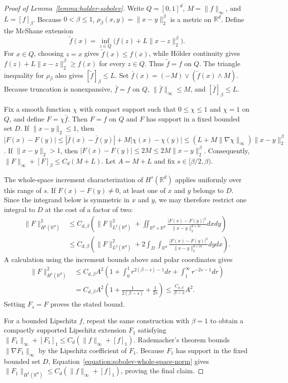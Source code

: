 \documentclass[letterpaper,12pt]{article}
\theoremstyle{definition}
\numberwithin{equation}{section}
\newcommand{\mr}{\mathbb{R}}
\newcommand{\norm}[1]{\lVert#1\rVert}
\begin{document}
\begin{proof}[Proof of Lemma~\ref{lemma:holder-sobolev}]
Write $Q=[0,1]^d$, $M=\norm{f}_\infty$, and $L=[f]_\beta$.
Because $0<\beta\leq1$, $\rho_\beta(x,y)=\norm{x-y}_2^\beta$ is a metric on $\mr^d$.
Define the McShane extension
\begin{equation}\label{equation:holder-extension}
\tilde f(x)=\inf_{z\in Q}\bigl(f(z)+L\norm{x-z}_2^\beta\bigr).
\end{equation}
For $x\in Q$, choosing $z=x$ gives $\tilde f(x)\leq f(x)$, while H\"older continuity gives $f(z)+L\norm{x-z}_2^\beta\geq f(x)$ for every $z\in Q$.
Thus $\tilde f=f$ on $Q$.
The triangle inequality for $\rho_\beta$ also gives $[\tilde f]_\beta\leq L$.
Set $\bar f(x)=(-M)\vee(\tilde f(x)\wedge M)$.
Because truncation is nonexpansive, $\bar f=f$ on $Q$, $\norm{\bar f}_\infty\leq M$, and $[\bar f]_\beta\leq L$.

Fix a smooth function $\chi$ with compact support such that $0\leq\chi\leq1$ and $\chi=1$ on $Q$, and define $F=\chi\bar f$.
Then $F=f$ on $Q$ and $F$ has support in a fixed bounded set $D$.
If $\norm{x-y}_2\leq1$, then $|F(x)-F(y)|\leq|\bar f(x)-\bar f(y)|+M|\chi(x)-\chi(y)|\leq(L+M\norm{\nabla\chi}_\infty)\norm{x-y}_2^\beta$.
If $\norm{x-y}_2>1$, then $|F(x)-F(y)|\leq2M\leq2M\norm{x-y}_2^\beta$.
Consequently, $\norm{F}_\infty+[F]_\beta\leq C_d(M+L)$.
Let $A=M+L$ and fix $s\in[\beta/2,\beta)$.

The whole-space increment characterization of $H^s(\mr^d)$ \citep{adams2003sobolev} applies uniformly over this range of $s$.
If $F(x)-F(y)\neq0$, at least one of $x$ and $y$ belongs to $D$.
Since the integrand below is symmetric in $x$ and $y$, we may therefore restrict one integral to $D$ at the cost of a factor of two:
\begin{align*}
\norm{F}_{H^s(\mr^d)}^2&\leq C_{d,\beta}\left(\norm{F}_{L^2(\mr^d)}^2+\iint_{\mr^d\times\mr^d}\frac{|F(x)-F(y)|^2}{\norm{x-y}_2^{d+2s}}dxdy\right)\\
&\leq C_{d,\beta}\left(\norm{F}_{L^2(\mr^d)}^2+2\int_D\int_{\mr^d}\frac{|F(x)-F(y)|^2}{\norm{x-y}_2^{d+2s}}dydx\right).
\end{align*}
A calculation using the increment bounds above and polar coordinates gives
\begin{align*}
\norm{F}_{H^s(\mr^d)}^2&\leq C_{d,\beta}A^2\left(1+\int_0^1r^{2(\beta-s)-1}dr+\int_1^\infty r^{-2s-1}dr\right)\\
&=C_{d,\beta}A^2\left(1+\frac1{2(\beta-s)}+\frac1{2s}\right)\leq\frac{C_{d,\beta}}{\beta-s}A^2.
\end{align*}
Setting $F_s=F$ proves the stated bound.

For a bounded Lipschitz $f$, repeat the same construction with $\beta=1$ to obtain a compactly supported Lipschitz extension $F_1$ satisfying $\norm{F_1}_\infty+[F_1]_1\leq C_d(\norm{f}_\infty+[f]_1)$.
Rademacher's theorem bounds $\norm{\nabla F_1}_\infty$ by the Lipschitz coefficient of $F_1$.
Because $F_1$ has support in the fixed bounded set $D$, Equation~\eqref{equation:sobolev-whole-space-norm} gives $\norm{F_1}_{H^1(\mr^d)}\leq C_d(\norm{f}_\infty+[f]_1)$, proving the final claim.
\end{proof}
\end{document}
